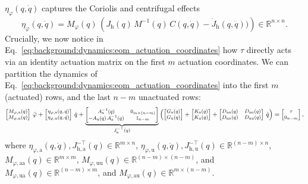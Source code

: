 $\eta_\varphi(q,\dot{q})$ captures the Coriolis and centrifugal effects
\begin{equation}
    \eta_\varphi(q, \dot{q}) = M_\varphi(q) \, \left ( J_\mathrm{h}(q) \, M^{-1}(q) \, C(q,\dot{q}) - \dot{J}_\mathrm{h}(q,\dot{q})) \right ) \in \mathbb{R}^{n \times n}.
\end{equation}
Crucially, we now notice in Eq.~\ref{eq:background:dynamics:eom_actuation_coordinates} how $\tau$ directly acts via an identity actuation matrix on the first $m$ actuation coordinates.
%
We can partition the dynamics of Eq.~\ref{eq:background:dynamics:eom_actuation_coordinates} into the first $m$ (actuated) rows, and the last $n-m$ unactuated rows:
\begin{equation}\footnotesize
    \begin{bmatrix}
        M_{\varphi,\mathrm{a}}(q)\\ 
        M_{\varphi,\mathrm{u}}(q)
    \end{bmatrix} \, \ddot{\varphi} + \begin{bmatrix}
        \eta_{\varphi,\mathrm{a}}(q,\dot{q})\\ \eta_{\varphi,\mathrm{u}}(q,\dot{q})
    \end{bmatrix} \, \dot{q} + \underbrace{\begin{bmatrix}
        A_\mathrm{a}^{-1}(q) & 0_{m \times (n-m)}\\
        -A_\mathrm{u}(q) \, A_\mathrm{a}^{-1}(q) & \mathbb{I}_{n-m}
    \end{bmatrix}}_{J_\mathrm{h}^{-\top}(q)} \left ( \begin{bmatrix}
        G_\mathrm{a}(q)\\ G_\mathrm{u}(q)
    \end{bmatrix} + \begin{bmatrix}
        K_\mathrm{a}(q)\\ K_\mathrm{u}(q)
    \end{bmatrix} + \begin{bmatrix}
        D_\mathrm{aa}(q) & D_\mathrm{au}(q)\\ 
        D_\mathrm{ua}(q) & D_\mathrm{uu}(q)
    \end{bmatrix} \, \dot{q} \right ) = \begin{bmatrix}
        \tau\\ 0_{n-m}
    \end{bmatrix},
\end{equation}
where $\eta_{\varphi,\mathrm{a}}(q,\dot{q}), J_{\mathrm{h},\mathrm{a}}^{-\top}(q) \in \mathbb{R}^{m \times n}$, $\eta_{\varphi,\mathrm{u}}(q,\dot{q}), J_{\mathrm{h},\mathrm{u}}^{-\top}(q) \in \mathbb{R}^{(n-m) \times n}$, $M_{\varphi,\mathrm{aa}}(q) \in \mathbb{R}^{m \times m}$, $M_{\varphi,\mathrm{uu}}(q) \in \mathbb{R}^{(n-m) \times (n-m)}$, and $M_{\varphi,\mathrm{ua}}(q) \in \mathbb{R}^{(n-m) \times m}$, and $M_{\varphi,\mathrm{au}}(q) \in \mathbb{R}^{m \times (n-m)}$.
